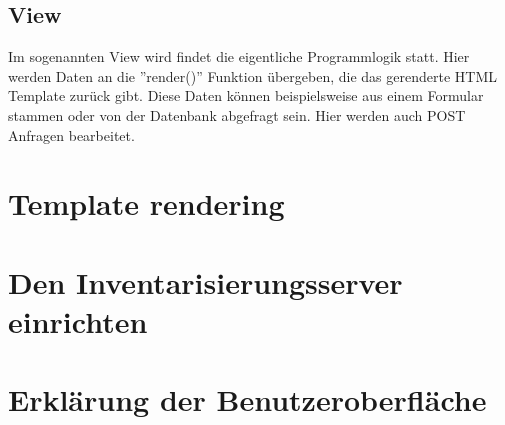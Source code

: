 \documentclass{article}
\begin{document}
\subsection{View}
Im sogenannten View wird findet die eigentliche Programmlogik statt. Hier werden Daten an die ''render()'' Funktion übergeben, die das gerenderte HTML Template zurück gibt. Diese Daten können beispielsweise aus einem Formular stammen oder von der Datenbank abgefragt sein. Hier werden auch POST Anfragen bearbeitet.
\section{Template rendering}
\section{Den Inventarisierungsserver einrichten}
\section{Erklärung der Benutzeroberfläche}
\end{document}
